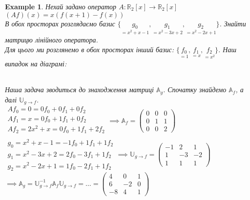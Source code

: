 \documentclass[a4paper, 10pt]{article}
\theoremstyle{theoremdd}
\newtheorem{example}[theorem]{Example}
\begin{document}
\begin{example}
Нехай задано оператор $A: \mathbb{R}_2[x] \to \mathbb{R}_2[x]$\\
$(Af)(x) = x(f(x+1)-f(x))$\\
В обох просторах розглядаємо базис $\{\underset{=x^2+x-1}{g_0},\underset{=x^2-3x+2}{g_1},\underset{=x^2-2x+1}{g_2}\}$. Знайти матрицю лінійного оператора.\\
Для цього ми розглянемо в обох просторах інший базис: $\{\underset{=1}{f_0},\underset{=x}{f_1},\underset{=x^2}{f_2}\}$. Наш випадок на діаграмі:\\
\\
Наша задача зводиться до знаходження матриці $\mathbb{A}_g$. Спочатку знайдемо $\mathbb{A}_f$, а далі $\mathbb{U}_{g \to f}$.\\
$
\begin{gathered}
Af_0 = 0 = 0f_0 + 0f_1 + 0f_2\\
Af_1 = x = 0f_0 + 1f_1 + 0f_2\\
Af_2 = 2x^2+x = 0f_0+1f_1+2f_2\\
\end{gathered} \implies \mathbb{A}_f = \begin{pmatrix}
0 & 0 & 0 \\
0 & 1 & 1 \\
0 & 0 & 2
\end{pmatrix}
$
\bigskip \\
$
\begin{gathered}
g_0 = x^2+x-1 = -1f_0+1f_1+1f_2\\
g_1 = x^2-3x+2 = 2f_0-3f_1+1f_2\\
g_2 = x^2-2x+1 = 1f_0-2f_1+1f_2
\end{gathered} \implies \mathbb{U}_{g \to f} = \begin{pmatrix}
-1 & 2 & 1 \\
1 & -3 & -2 \\
1 & 1 & 1
\end{pmatrix}
$\\
$\implies \mathbb{A}_g = \mathbb{U}_{g \to f}^{-1} \mathbb{A}_f \mathbb{U}_{g \to f} = \dots = \begin{pmatrix}
4 & 0 & 1 \\
6 & -2 & 0 \\
-8 & 4 & 1
\end{pmatrix}$
\end{example}
\end{document}
